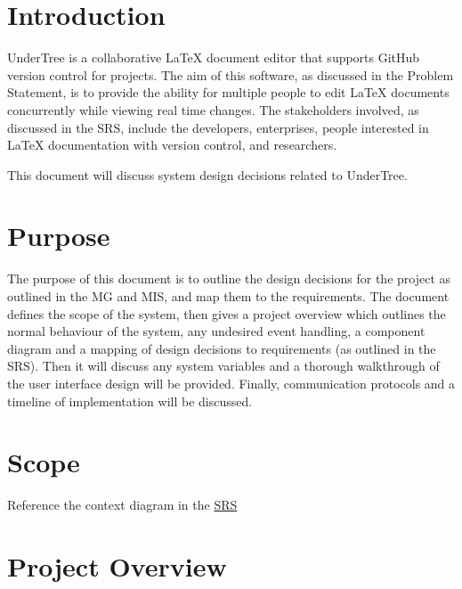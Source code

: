 \documentclass[12pt, titlepage]{article}
\begin{document}
	\newpage
	
	\tableofcontents
	
	\newpage
	
	\listoftables
	
	\listoffigures
	
	\newpage
	
	
	\section{Introduction}
	UnderTree is a collaborative LaTeX document editor that supports GitHub version control for projects. The aim of this software, as discussed in the Problem Statement, is to provide the ability for multiple people to edit LaTeX documents concurrently while viewing real time changes. The stakeholders involved, as discussed in the SRS, include the developers, enterprises, people interested in LaTeX documentation with version control, and researchers.
	
	This document will discuss system design decisions related to UnderTree.
	
	\section{Purpose}
	The purpose of this document is to outline the design decisions for the project as outlined in the MG and MIS, and map them to the requirements. The document defines the scope of the system, then gives a project overview which outlines the normal behaviour of the system, any undesired event handling, a component diagram and a mapping of design decisions to requirements (as outlined in the SRS). Then it will discuss any system variables and a thorough walkthrough of the user interface design will be provided. Finally, communication protocols and a timeline of implementation will be discussed.
	
	\section{Scope}
	
	Reference the context diagram in the \href{https://github.com/RutheniumVI/UnderTree/blob/main/docs/SRS/SRS.pdf}{SRS}
	
	\section{Project Overview}
	
\end{document}
